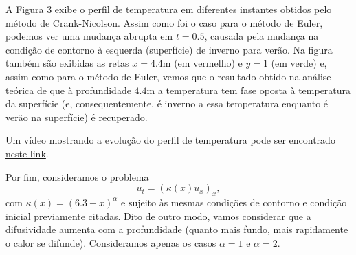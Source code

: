 \documentclass[twocolumn,showpacs,%
  nofootinbib,aps,superscriptaddress,%
  eqsecnum,prd,notitlepage,showkeys,10pt]{revtex4-1} %
\begin{document}
	A Figura 3 exibe o perfil de temperatura em diferentes instantes
	obtidos pelo método de Crank-Nicolson.
	Assim como foi o caso para o método de Euler, podemos ver uma mudança abrupta em $t=0.5$,
	causada pela mudança na condição de contorno
	à esquerda (superfície) de inverno para verão. Na figura também são exibidas as retas 
	$x=4.4$m (em vermelho) e $y=1$ (em verde) e, assim como para o método de Euler, vemos
	que o resultado obtido na análise teórica de que
	à profundidade $4.4$m a temperatura tem fase oposta à temperatura da superfície
	(e, consequentemente, é inverno a essa temperatura enquanto é verão na superfície)
	é recuperado.
	
	Um vídeo mostrando a evolução do perfil de temperatura pode ser encontrado
	\href{https://github.com/CaioTomas/Trabalho-IMCEDP/blob/main/Report/Codes/crank-nicolson.mp4}{neste link}.

	Por fim, consideramos o problema
	\begin{equation}
		u_t = {\left( \kappa(x)u_x \right)}_x,
	\end{equation}
	com $\kappa(x) = {(6.3 + x)}^{\alpha}$ e sujeito às mesmas condições de contorno e condição inicial previamente citadas.
	Dito de outro modo, vamos considerar que a difusividade aumenta com a profundidade
	(quanto mais fundo, mais rapidamente o calor se difunde). Consideramos apenas os casos $\alpha = 1$ e $\alpha = 2$.
\end{document}
